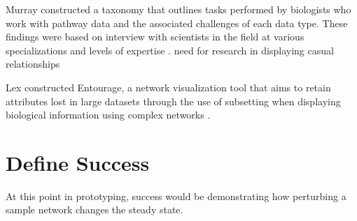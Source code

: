 \documentclass{proc}	%
\begin{document}
Murray constructed a taxonomy that outlines tasks performed by biologists who work with pathway data and the associated challenges of each data type. These findings were based on interview with scientists in the field at various specializations and levels of expertise \cite{Murray2017}.
need for research in displaying casual relationships

 Lex constructed Entourage, a network visualization tool that aims to retain attributes lost in large datasets through the use of subsetting when displaying biological information using complex networks \cite{Lex2013}.
\section{Define Success}
At this point in prototyping, success would be demonstrating how perturbing a sample network changes the steady state.
 

\end{document}
